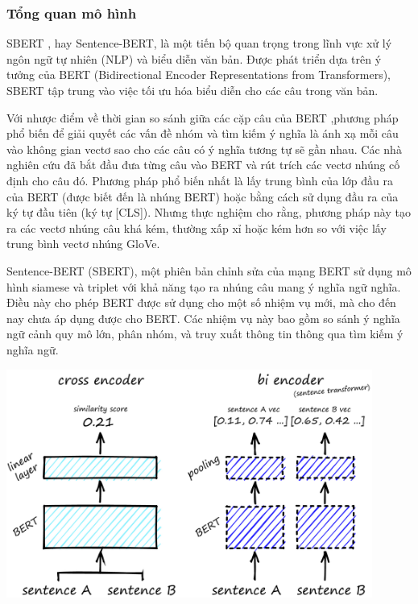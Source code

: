 \documentclass[a4paper, 12pt, openany]{book}
\begin{document}
\subsubsection{Tổng quan mô hình}
SBERT , hay Sentence-BERT, là một tiến bộ quan trọng trong lĩnh vực xử lý ngôn ngữ tự nhiên (NLP) và biểu diễn văn bản. Được phát triển dựa trên ý tưởng của BERT (Bidirectional Encoder Representations from Transformers), SBERT tập trung vào việc tối ưu hóa biểu diễn cho các câu trong văn bản.

Với nhược điểm về thời gian so sánh giữa các cặp câu của BERT
,phương pháp phổ biến để giải quyết các vấn đề nhóm và tìm kiếm ý nghĩa là ánh xạ mỗi câu vào không gian vectơ sao cho các câu có ý nghĩa tương tự sẽ gần nhau. Các nhà nghiên cứu đã bắt đầu đưa từng câu vào BERT và rút trích các vectơ nhúng cố định cho câu đó. Phương pháp phổ biến nhất là lấy trung bình của lớp đầu ra của BERT (được biết đến là nhúng BERT) hoặc bằng cách sử dụng đầu ra của ký tự đầu tiên (ký tự [CLS]). Nhưng thực nghiệm cho rằng, phương pháp này tạo ra các vectơ nhúng câu khá kém, thường xấp xỉ hoặc kém hơn so với việc lấy trung bình vectơ nhúng GloVe.

Sentence-BERT (SBERT), một phiên bản chỉnh sửa của mạng BERT sử dụng mô hình siamese và triplet với khả năng tạo ra nhúng câu mang ý nghĩa ngữ nghĩa. Điều này cho phép BERT được sử dụng cho một số nhiệm vụ mới, mà cho đến nay chưa áp dụng được cho BERT. Các nhiệm vụ này bao gồm so sánh ý nghĩa ngữ cảnh quy mô lớn, phân nhóm, và truy xuất thông tin thông qua tìm kiếm ý nghĩa ngữ.

\begin{minipage}{\linewidth}
    \captionsetup{type=figure}
    \centering
    \includegraphics[width=12cm]{./assets/images/sbert1.jpg}
\end{minipage}
\end{document}
